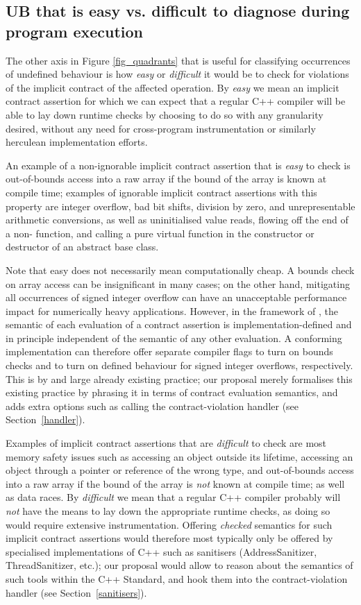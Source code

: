 \subsection{UB that is easy vs. difficult to diagnose during program execution}
\label{easy}

The other axis in Figure \ref{fig_quadrants} that is useful for classifying occurrences of undefined behaviour is how \emph{easy} or \emph{difficult} it would be to check for violations of the implicit contract of the affected operation. By \emph{easy} we mean an implicit contract assertion for which we can expect that a regular C++ compiler will be able to lay down runtime checks by choosing to do so with any granularity desired, without any need for cross-program instrumentation or similarly herculean implementation efforts.

An example of a non-ignorable implicit contract assertion that is \emph{easy} to check is out-of-bounds access into a raw array if the bound of the array is known at compile time; examples of ignorable implicit contract assertions with this property are integer overflow, bad bit shifts, division by zero, and unrepresentable arithmetic conversions, as well as uninitialised value reads, flowing off the end of a non- function, and calling a pure virtual function in the constructor or destructor of an abstract base class.

Note that easy does not necessarily mean computationally cheap. A bounds check on array access can be insignificant in many cases; on the other hand, mitigating all occurrences of signed integer overflow can have an unacceptable performance impact for numerically heavy applications. However, in the framework of \cite{P2900R9}, the semantic of each evaluation of a contract assertion is implementation-defined and in principle independent of the semantic of any other evaluation. A conforming implementation can therefore offer separate compiler flags to turn on bounds checks and to turn on defined behaviour for signed integer overflows, respectively. This is by and large already existing practice; our proposal merely formalises this existing practice by phrasing it in terms of contract evaluation semantics, and adds extra options such as calling the contract-violation handler (see Section~\ref{handler}).

Examples of implicit contract assertions that are \emph{difficult} to check are most memory safety issues such as accessing an object outside its lifetime, accessing an object through a pointer or reference of the wrong type, and out-of-bounds access into a raw array if the bound of the array is \emph{not} known at compile time; as well as data races. By \emph{difficult} we mean that a regular C++ compiler probably will \emph{not} have the means to lay down the appropriate runtime checks, as doing so would require extensive instrumentation. Offering \emph{checked} semantics for such implicit contract assertions would therefore most typically only be offered by specialised implementations of C++ such as sanitisers (AddressSanitizer, ThreadSanitizer, etc.); our proposal would allow to reason about the semantics of such tools within the C++ Standard, and hook them into the contract-violation handler (see Section~\ref{sanitisers}).

